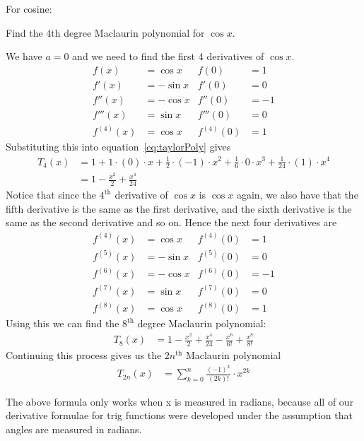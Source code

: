 For cosine:
\begin{eg}\label{eg expand cosx}
 Find the 4th degree Maclaurin polynomial for $\cos x$.

\soln We have $a=0$ and we need to find the first 4 derivatives of $\cos x$.
\begin{align*}
 f(x) &= \cos x & f(0) &= 1 \\
 f'(x) &= -\sin x & f'(0) &= 0 \\
 f''(x) &= -\cos x & f''(0) &= -1 \\
 f'''(x) &= \sin x & f'''(0) &= 0 \\
 f^{(4)}(x) &= \cos x & f^{(4)}(0) &= 1
\end{align*}
Substituting this into equation~\eqref{eq:taylorPoly} gives
\begin{align*}
  T_4(x)&= 1 + 1\cdot (0) \cdot x
  + \frac{1}{2} \cdot (-1) \cdot x^2
  + \frac{1}{6} \cdot 0 \cdot x^3
  + \frac{1}{24} \cdot (1) \cdot x^4 \\
  &= 1 - \frac{x^2}{2} + \frac{x^4}{24}
\end{align*}
Notice that since the $4^\mathrm{th}$ derivative of $\cos x$ is $\cos x$ again, we also
have that the fifth derivative is the same as the first derivative, and the sixth
derivative is the same as the second derivative and so on. Hence the next four
derivatives are
\begin{align*}
 f^{(4)}(x) &= \cos x & f^{(4)}(0) &= 1 \\
 f^{(5)}(x) &= -\sin x & f^{(5)}(0) &= 0 \\
 f^{(6)}(x) &= -\cos x & f^{(6)}(0) &= -1 \\
 f^{(7)}(x) &= \sin x & f^{(7)}(0) &= 0 \\
 f^{(8)}(x) &= \cos x & f^{(8)}(0) &= 1
\end{align*}
Using this we can find the $8^\mathrm{th}$ degree Maclaurin polynomial:
\begin{align*}
  T_8(x) &=
  1 - \frac{x^2}{2} + \frac{x^4}{24} -\frac{x^6}{6!} + \frac{x^8}{8!}
\end{align*}
Continuing this process gives us the $2n^\mathrm{th}$ Maclaurin polynomial
\begin{align*}
  T_{2n}(x) &= \sum_{k=0}^n \frac{(-1)^k}{(2k)!} \cdot x^{2k}
\end{align*}
\begin{warning}
The above formula only works when x is measured in radians, because all of our
derivative formulae for trig functions were developed under the assumption that
angles are measured in radians.
\end{warning}


\end{eg}
